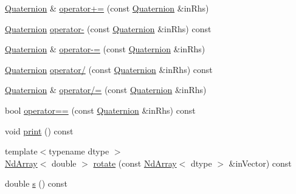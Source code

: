 \begin{DoxyCompactItemize}
\item 
\mbox{\hyperlink{class_num_cpp_1_1_rotations_1_1_quaternion}{Quaternion}} \& \mbox{\hyperlink{class_num_cpp_1_1_rotations_1_1_quaternion_ae38581ed3b06acb8aca2eaf8774d6ba9}{operator+=}} (const \mbox{\hyperlink{class_num_cpp_1_1_rotations_1_1_quaternion}{Quaternion}} \&in\+Rhs)
\item 
\mbox{\hyperlink{class_num_cpp_1_1_rotations_1_1_quaternion}{Quaternion}} \mbox{\hyperlink{class_num_cpp_1_1_rotations_1_1_quaternion_ab01ead254d02e77ebb4f9de7b9e54436}{operator-\/}} (const \mbox{\hyperlink{class_num_cpp_1_1_rotations_1_1_quaternion}{Quaternion}} \&in\+Rhs) const
\item 
\mbox{\hyperlink{class_num_cpp_1_1_rotations_1_1_quaternion}{Quaternion}} \& \mbox{\hyperlink{class_num_cpp_1_1_rotations_1_1_quaternion_a0c71cbe7d90a5614bbcc50ecb1dcd3ce}{operator-\/=}} (const \mbox{\hyperlink{class_num_cpp_1_1_rotations_1_1_quaternion}{Quaternion}} \&in\+Rhs)
\item 
\mbox{\hyperlink{class_num_cpp_1_1_rotations_1_1_quaternion}{Quaternion}} \mbox{\hyperlink{class_num_cpp_1_1_rotations_1_1_quaternion_afddb51d5a55ad36e578e1aefc639f1f5}{operator/}} (const \mbox{\hyperlink{class_num_cpp_1_1_rotations_1_1_quaternion}{Quaternion}} \&in\+Rhs) const
\item 
\mbox{\hyperlink{class_num_cpp_1_1_rotations_1_1_quaternion}{Quaternion}} \& \mbox{\hyperlink{class_num_cpp_1_1_rotations_1_1_quaternion_af8c32b0d46875ff17e6731c4a4a28c78}{operator/=}} (const \mbox{\hyperlink{class_num_cpp_1_1_rotations_1_1_quaternion}{Quaternion}} \&in\+Rhs)
\item 
bool \mbox{\hyperlink{class_num_cpp_1_1_rotations_1_1_quaternion_a6060fb86327e0c1f429e9e40612f6467}{operator==}} (const \mbox{\hyperlink{class_num_cpp_1_1_rotations_1_1_quaternion}{Quaternion}} \&in\+Rhs) const
\item 
void \mbox{\hyperlink{class_num_cpp_1_1_rotations_1_1_quaternion_a99e71bd7900477b9eedc1372002a1163}{print}} () const
\item 
{\footnotesize template$<$typename dtype $>$ }\\\mbox{\hyperlink{class_num_cpp_1_1_nd_array}{Nd\+Array}}$<$ double $>$ \mbox{\hyperlink{class_num_cpp_1_1_rotations_1_1_quaternion_a71862c53e031f0667397f97f2bf08a09}{rotate}} (const \mbox{\hyperlink{class_num_cpp_1_1_nd_array}{Nd\+Array}}$<$ dtype $>$ \&in\+Vector) const
\item 
double \mbox{\hyperlink{class_num_cpp_1_1_rotations_1_1_quaternion_a9652f86c1fb09a97cb9ef6d31d40e5f9}{s}} () const

\end{DoxyCompactItemize}
